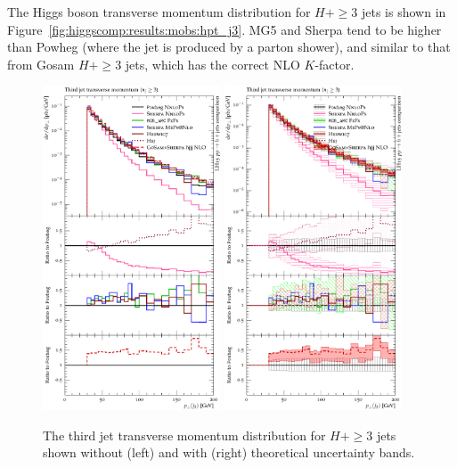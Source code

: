 The Higgs boson transverse momentum distribution for $H+\ge3$ jets is
shown in Figure~\ref{fig:higgscomp:results:mobs:hpt_j3}. MG5 and
Sherpa tend to be higher than Powheg (where the jet is produced by a
parton shower), and similar to that from Gosam $H+\ge3$ jets, which
has the correct NLO $K$-factor.

\begin{figure}[t!]
  \centering
  \includegraphics[width=0.47\textwidth]{figures/hjetscomp_u_jet3_pT_incl.pdf}
  \hfill
  \includegraphics[width=0.47\textwidth]{figures/hjetscomp_jet3_pT_incl.pdf}
  \caption{
    The third jet transverse momentum distribution for $H+\ge3$ jets
    shown without (left) and with (right) theoretical uncertainty bands.
    \label{fig:higgscomp:results:mobs:j3pt}
  }
\end{figure}

